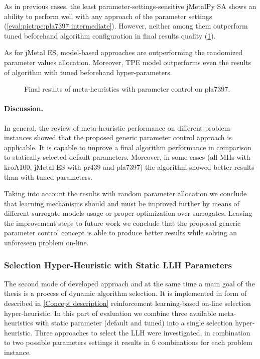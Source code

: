 As in previous cases, the least parameter-settings-sensitive jMetalPy SA shows an ability to perform well with any approach of the parameter settings (\cref{eval:pict:pc:pla7397 intermediate}). However, neither among them outperform tuned beforehand algorithm configuration in final results quality (\cref{eval:pict:pc:pla7397 final}).

As for jMetal ES, model-based approaches are outperforming the randomized parameter values allocation. Moreover, TPE model outperforms even the results of algorithm with tuned beforehand hyper-parameters.

\begin{figure}[b]
	\centering
	
	\caption{Final results of meta-heuristics with parameter control on pla7397.}
	\label{eval:pict:pc:pla7397 final}
\end{figure}

\newpage
\paragraph{Discussion.} In general, the review of meta-heuristic performance on different problem instances showed that the proposed generic parameter control approach is applicable. It is capable to improve a final algorithm performance in comparison to statically selected default parameters. Moreover, in some cases (all MHs with kroA100, jMetal ES with pr439 and pla7397) the algorithm showed better results than with tuned parameters.

Taking into account the results with random parameter allocation we conclude that learning mechanisms should and must be improved further by means of different surrogate models usage or proper optimization over surrogates. Leaving the improvement steps to future work we conclude that the proposed generic parameter control concept is able to produce better results while solving an unforeseen problem on-line.


\subsubsection{Selection Hyper-Heuristic with Static LLH Parameters}
The second mode of developed approach and at the same time a main goal of the thesis is a process of dynamic algorithm selection. It is implemented in form of described in \cref{Concept description} reinforcement learning-based on-line selection hyper-heuristic. In this part of evaluation we combine three available meta-heuristics with static parameter (default and tuned) into a single selection hyper-heuristic. Three approaches to select the LLH were investigated, in combination to two possible parameters settings it results in 6 combinations for each problem instance.

